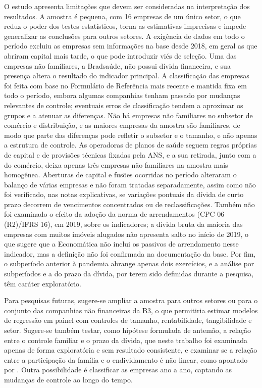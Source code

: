 O estudo apresenta limitações que devem ser consideradas na interpretação dos
resultados. A amostra é pequena, com 16 empresas de um único setor, o que reduz o
poder dos testes estatísticos, torna as estimativas imprecisas e impede
generalizar as conclusões para outros setores. A exigência de dados em todo o
período excluiu as empresas sem informações na base desde 2018, em geral as que
abriram capital mais tarde, o que pode introduzir viés de seleção. Uma das empresas não familiares, a Bradsaúde, não
possui dívida financeira, e sua presença altera o resultado do indicador
principal. A classificação das empresas foi feita com base no Formulário de
Referência mais recente e mantida fixa em todo o período, embora algumas
companhias tenham passado por mudanças relevantes de controle; eventuais erros de
classificação tendem a aproximar os grupos e a atenuar as diferenças. Não há
empresas não familiares no subsetor de comércio e distribuição, e as maiores
empresas da amostra são familiares, de modo que parte das diferenças pode refletir
o subsetor e o tamanho, e não apenas a estrutura de controle. As
operadoras de planos de saúde seguem regras próprias de capital e de provisões
técnicas fixadas pela ANS, e a sua retirada, junto com a do comércio, deixa
apenas três empresas não familiares na amostra mais homogênea.
Aberturas de capital e fusões ocorridas no período alteraram o balanço de várias
empresas e não foram tratadas separadamente, assim como não foi verificado, nas
notas explicativas, se variações pontuais da dívida de curto prazo decorrem de
vencimentos concentrados ou de reclassificações. Também não foi examinado o efeito
da adoção da norma de arrendamentos (CPC 06 (R2)/IFRS 16), em 2019, sobre os
indicadores; a dívida bruta da maioria das empresas com muitos imóveis alugados não
apresenta salto no início de 2019, o que sugere que a Economática não inclui os
passivos de arrendamento nesse indicador, mas a definição não foi confirmada na
documentação da base.
Por fim, o subperíodo anterior à pandemia abrange apenas dois exercícios, e a
análise por subperíodos e a do prazo da dívida, por terem sido definidas durante a
pesquisa, têm caráter exploratório.

Para pesquisas futuras, sugere-se ampliar a amostra para outros setores ou para o
conjunto das companhias não financeiras da B3, o que permitiria estimar modelos de
regressão em painel com controles de tamanho, rentabilidade, tangibilidade e setor.
Sugere-se também testar, como hipótese formulada de antemão, a relação entre o
controle familiar e o prazo da dívida, que neste trabalho foi examinada apenas de
forma exploratória e sem resultado consistente, e examinar se a relação entre a participação da família e o
endividamento é não linear, como apontado por . Outra
possibilidade é classificar as empresas ano a ano, captando as mudanças de controle
ao longo do tempo.
